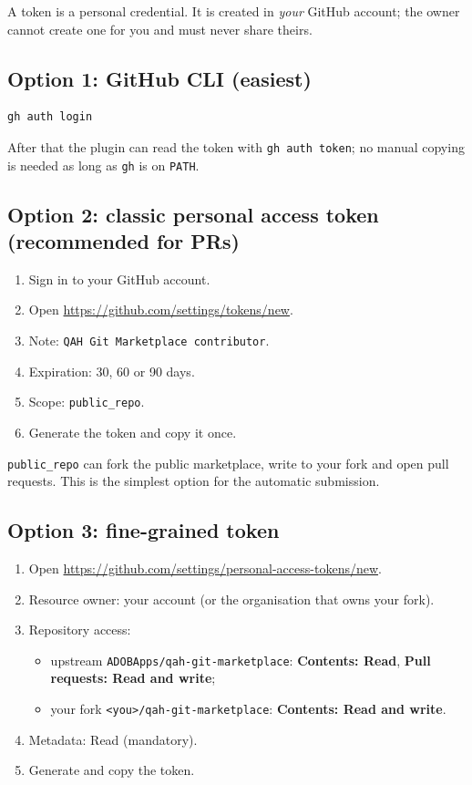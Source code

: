 \documentclass[11pt,a4paper]{article}
\newcommand{\code}[1]{\texttt{#1}}
\begin{document}
A token is a personal credential. It is created in \emph{your} GitHub account;
the owner cannot create one for you and must never share theirs.

\subsection{Option 1: GitHub CLI (easiest)}

\begin{lstlisting}[language=bash,caption={Terminal}]
gh auth login
\end{lstlisting}

After that the plugin can read the token with \code{gh auth token}; no manual
copying is needed as long as \code{gh} is on \code{PATH}.

\subsection{Option 2: classic personal access token (recommended for PRs)}

\begin{enumerate}[leftmargin=1.5em]
  \item Sign in to your GitHub account.
  \item Open \url{https://github.com/settings/tokens/new}.
  \item Note: \code{QAH Git Marketplace contributor}.
  \item Expiration: 30, 60 or 90 days.
  \item Scope: \code{public\_repo}.
  \item Generate the token and copy it once.
\end{enumerate}

\code{public\_repo} can fork the public marketplace, write to your fork and open
pull requests. This is the simplest option for the automatic submission.

\subsection{Option 3: fine-grained token}

\begin{enumerate}[leftmargin=1.5em]
  \item Open \url{https://github.com/settings/personal-access-tokens/new}.
  \item Resource owner: your account (or the organisation that owns your fork).
  \item Repository access:
    \begin{itemize}
      \item upstream \code{ADOBApps/qah-git-marketplace}:
            \textbf{Contents: Read}, \textbf{Pull requests: Read and write};
      \item your fork \code{<you>/qah-git-marketplace}:
            \textbf{Contents: Read and write}.
    \end{itemize}
  \item Metadata: Read (mandatory).
  \item Generate and copy the token.
\end{enumerate}
\end{document}

